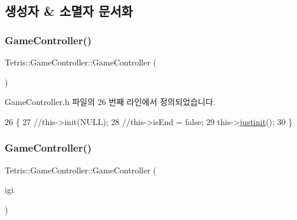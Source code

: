 \subsection{생성자 \& 소멸자 문서화}
\mbox{\label{class_tetris_1_1_game_controller_a968c9a79fca8a5a39e0c51edca0e5abb}} 
\subsubsection{\texorpdfstring{Game\+Controller()}{GameController()}\hspace{0.1cm}{\footnotesize\ttfamily [1/4]}}
{\footnotesize\ttfamily Tetris\+::\+Game\+Controller\+::\+Game\+Controller (\begin{DoxyParamCaption}{ }\end{DoxyParamCaption})\hspace{0.3cm}{\ttfamily [inline]}}



Game\+Controller.\+h 파일의 26 번째 라인에서 정의되었습니다.


\begin{DoxyCode}
26                             \{
27                 \textcolor{comment}{//this->init(NULL);}
28                 \textcolor{comment}{//this->isEnd = false;}
29                 this->\hyperlink{class_tetris_1_1_game_controller_aef406397d4719c9edd49774d0343ce05}{justinit}();
30             \}
\end{DoxyCode}
\mbox{\label{class_tetris_1_1_game_controller_a5dd9a021a0a87bed079bc1ad309e4039}} 
\subsubsection{\texorpdfstring{Game\+Controller()}{GameController()}\hspace{0.1cm}{\footnotesize\ttfamily [2/4]}}
{\footnotesize\ttfamily Tetris\+::\+Game\+Controller\+::\+Game\+Controller (\begin{DoxyParamCaption}\item[{\hyperlink{class_tetris_1_1_init_game_info}{Init\+Game\+Info} $\ast$}]{igi }\end{DoxyParamCaption})\hspace{0.3cm}{\ttfamily [inline]}}



